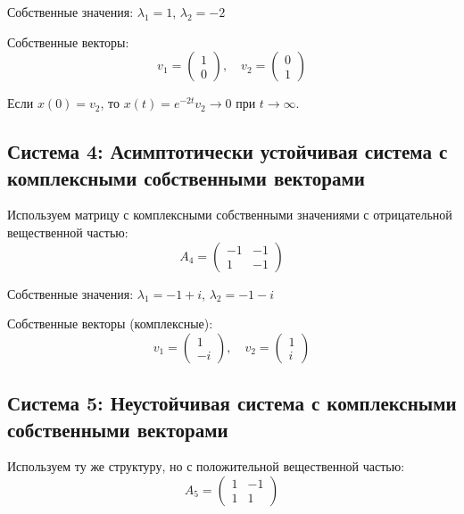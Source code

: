 Собственные значения: $\lambda_1 = 1$, $\lambda_2 = -2$

Собственные векторы:
\begin{equation}
v_1 = \begin{pmatrix} 1 \\ 0 \end{pmatrix}, \quad v_2 = \begin{pmatrix} 0 \\ 1 \end{pmatrix}
\end{equation}

Если $x(0) = v_2$, то $x(t) = e^{-2t}v_2 \to 0$ при $t \to \infty$.

\subsection{Система 4: Асимптотически устойчивая система с комплексными собственными векторами}

Используем матрицу с комплексными собственными значениями с отрицательной вещественной частью:
\begin{equation}
A_4 = \begin{pmatrix} -1 & -1 \\ 1 & -1 \end{pmatrix}
\end{equation}

Собственные значения: $\lambda_1 = -1 + i$, $\lambda_2 = -1 - i$

Собственные векторы (комплексные):
\begin{equation}
v_1 = \begin{pmatrix} 1 \\ -i \end{pmatrix}, \quad v_2 = \begin{pmatrix} 1 \\ i \end{pmatrix}
\end{equation}

\subsection{Система 5: Неустойчивая система с комплексными собственными векторами}

Используем ту же структуру, но с положительной вещественной частью:
\begin{equation}
A_5 = \begin{pmatrix} 1 & -1 \\ 1 & 1 \end{pmatrix}
\end{equation}

